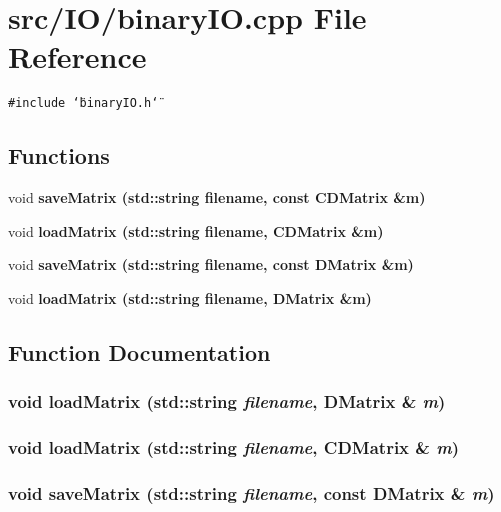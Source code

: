 \section{src/IO/binary\-IO.cpp File Reference}
\label{binaryIO_8cpp}
{\tt \#include \char`\"{}binary\-IO.h\char`\"{}}\par
\subsection*{Functions}
\begin{CompactItemize}
\item 
void \bf{save\-Matrix} (std::string filename, const \bf{CDMatrix} \&m)
\item 
void \bf{load\-Matrix} (std::string filename, \bf{CDMatrix} \&m)
\item 
void \bf{save\-Matrix} (std::string filename, const \bf{DMatrix} \&m)
\item 
void \bf{load\-Matrix} (std::string filename, \bf{DMatrix} \&m)
\end{CompactItemize}


\subsection{Function Documentation}
\subsubsection{\setlength{\rightskip}{0pt plus 5cm}void load\-Matrix (std::string {\em filename}, \bf{DMatrix} \& {\em m})}\label{binaryIO_8cpp_77a816ac6fd96aa523ae6278bed30e54}


\subsubsection{\setlength{\rightskip}{0pt plus 5cm}void load\-Matrix (std::string {\em filename}, \bf{CDMatrix} \& {\em m})}\label{binaryIO_8cpp_e981cf29be3572a514c1c2d8b005d46b}


\subsubsection{\setlength{\rightskip}{0pt plus 5cm}void save\-Matrix (std::string {\em filename}, const \bf{DMatrix} \& {\em m})}\label{binaryIO_8cpp_3ed19c8659354d707ac1a68646f73919}


